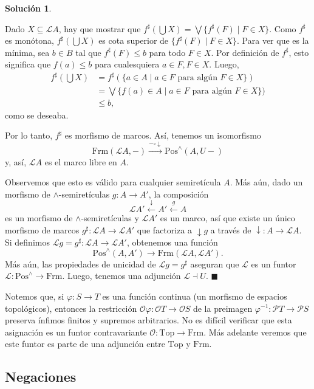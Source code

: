 \documentclass[12pt,letterpaper,titlepage]{article}
\newcommand{\xqed}[1]{%
  \leavevmode\unskip\penalty9999 \hbox{}\nobreak\hfill
  \quad\hbox{\ensuremath{#1}}}
\theoremstyle{definition}
\newtheorem*{soltemp}{Solución}
\newenvironment{sol}[1]{%
    \begin{soltemp}#1}{%
    \xqed{\blacksquare}\end{soltemp}%
}
\newcommand\Sup{\bigvee}
\newcommand\down{{\downarrow}}
\renewcommand\inf{\wedge}
\renewcommand\phi{\varphi}
\renewcommand\cal[1]{\mathcal{#1}}
\newcommand\rar[1]{\xrightarrow{#1}}
\newcommand\lar[1]{\xleftarrow{#1}}
\newcommand\<{\langle}
\renewcommand\>{\rangle}
\newcommand{\Frm}{\mathrm{Frm}}
\newcommand{\Top}{\mathrm{Top}}
\newcommand{\Pos}{\mathrm{Pos}}
\begin{document}
\begin{sol}
\begin{itemize}
        Dado $X\subseteq \cal LA$, hay que mostrar que
        $f^\sharp(\bigcup X)=\Sup\{f^\sharp(F) \mid F\in X\}$.
        Como $f^\sharp$ es monótona,
        $f^\sharp(\bigcup X)$ es cota superior de
        $\{f^\sharp(F) \mid F\in X\}$.
        Para ver que es la mínima, sea $b\in B$ tal que
        $f^\sharp(F)\leq b$ para todo $F\in X$.
        Por definición de $f^\sharp$, esto significa que
        $f(a)\leq b$ para cualesquiera $a\in F, F\in X$.
        Luego,
        \begin{align*}
            f^\sharp(\bigcup X)
            &= f^\sharp (
            \{a\in A \mid a\in F\text{ para algún }F\in X\}
            ) \\
            &=
            \Sup\{f(a)\in A \mid a\in F\text{ para algún }F\in X\}) \\
            &\leq b,
        \end{align*}
        como se deseaba.
    \end{itemize}
    Por lo tanto, $f^\sharp$ es morfismo de marcos.
    Así, tenemos un isomorfismo
    \[
        \Frm(\cal LA,-)\rar{-\circ \down} \Pos^\inf(A,U-)
    \]
    y, así, $\cal LA$ es el marco libre en $A$.
    
    Observemos que esto es válido para cualquier
    semiretícula $A$.
    Más aún, dado un morfismo de $\inf$-semiretículas
    $g:A\to A'$, la composición
    \[
        \cal LA' \lar \down A' \lar g A
    \]
    es un morfismo de $\inf$-semiretículas y
    $\cal LA'$ es un marco, así que
    existe un único morfismo de marcos
    $g^\sharp:\cal LA\to \cal LA'$ que factoriza a
    $\down g$ a través de $\down:A\to \cal LA$.
    Si definimos $\cal Lg=g^\sharp:\cal LA\to\cal LA'$,
    obtenemos una función
    \[
        \Pos^\inf(A,A') \to \Frm(\cal LA,\cal LA')
    .\]
    Más aún, las propiedades de unicidad de
    $\cal Lg=g^\sharp$ aseguran que $\cal L$ es un funtor
    $\cal L:\Pos^\inf\to\Frm$.
    Luego, tenemos una adjunción $\cal L\dashv U$.
\end{sol}

Notemos que, si $\phi:S\to T$ es una función continua
(un morfismo de espacios topológicos),
entonces la restricción $\cal O\phi:\cal OT\to\cal OS$
de la preimagen $\phi^{-1}:\cal PT\to\cal PS$ preserva ínfimos
finitos y supremos arbitrarios.
No es difícil verificar que esta asignación
es un funtor contravariante $\cal O:\Top\to\Frm$.
Más adelante veremos que este funtor es parte de una adjunción entre
$\Top$ y $\Frm$.

\subsection{Negaciones}
\end{document}
